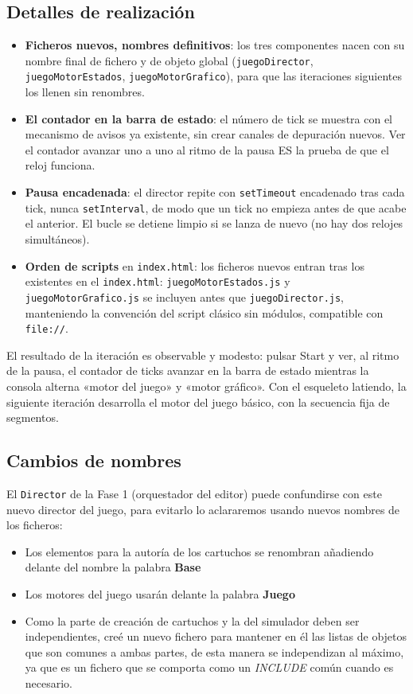 \subsection{Detalles de realización}
\label{subsec:DetallesF2I2}

\begin{itemize}
	\item \textbf{Ficheros nuevos, nombres definitivos}: los tres componentes nacen con su nombre final de fichero y de objeto global (\texttt{juegoDirector}, \texttt{juegoMotorEstados}, \texttt{juegoMotorGrafico}), para que las iteraciones siguientes los llenen sin renombres.
	\item \textbf{El contador en la barra de estado}: el número de tick se muestra con el mecanismo de avisos ya existente, sin crear canales de depuración nuevos. Ver el contador avanzar uno a uno al ritmo de la pausa ES la prueba de que el reloj funciona.
	\item \textbf{Pausa encadenada}: el director repite con \texttt{setTimeout} encadenado tras cada tick, nunca \texttt{setInterval}, de modo que un tick no empieza antes de que acabe el anterior. El bucle se detiene limpio si se lanza de nuevo (no hay dos relojes simultáneos).
	\item \textbf{Orden de scripts} en \texttt{index.html}: los ficheros nuevos entran tras los existentes en el \texttt{index.html}: \texttt{juegoMotorEstados.js} y \texttt{juegoMotorGrafico.js} se incluyen antes que \texttt{juegoDirector.js}, manteniendo la convención del script clásico sin módulos, compatible con \texttt{file://}.
\end{itemize}

El resultado de la iteración es observable y modesto: pulsar Start y ver, al ritmo de la pausa, el contador de ticks avanzar en la barra de estado mientras la consola alterna «motor del juego» y «motor gráfico». Con el esqueleto latiendo, la siguiente iteración desarrolla el motor del juego básico, con la secuencia fija de segmentos.

\subsection{Cambios de nombres}
 El \texttt{Director} de la Fase 1 (orquestador del editor) puede confundirse con este nuevo director del juego, para evitarlo lo aclararemos usando nuevos nombres de los ficheros:

\begin{itemize}
  	\item Los elementos para la autoría de los cartuchos se renombran añadiendo delante del nombre la palabra \textbf{Base}
  	\item Los motores del juego usarán delante la palabra \textbf{Juego}
  	\item Como la parte de creación de cartuchos y la del simulador deben ser independientes, creé un nuevo fichero para mantener en él las listas de objetos que son comunes a ambas partes, de esta manera se independizan al máximo, ya que es un fichero que se comporta como un \emph{INCLUDE} común cuando es necesario.
\end{itemize}
  

